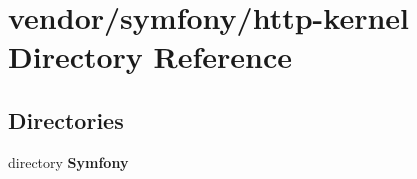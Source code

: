 \section{vendor/symfony/http-\/kernel Directory Reference}
\label{dir_04acdd6ead74b58a0476bab1ed4296f6}
\subsection*{Directories}
\begin{DoxyCompactItemize}
\item 
directory {\bf Symfony}
\end{DoxyCompactItemize}
